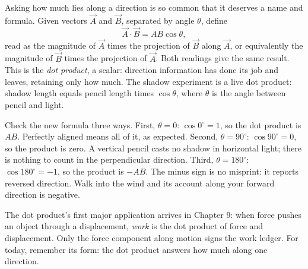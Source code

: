 \begin{mainline}
Asking how much lies along a direction is so common that it deserves a name and formula. Given vectors \(\vec{A}\) and \(\vec{B}\), separated by angle \(\theta\), define
\[
  \vec{A}\cdot\vec{B} = AB\cos\theta ,
\]
read as the magnitude of \(\vec{A}\) times the projection of \(\vec{B}\) along \(\vec{A}\), or equivalently the magnitude of \(\vec{B}\) times the projection of \(\vec{A}\). Both readings give the same result. This is the \emph{dot product}, a scalar: direction information has done its job and leaves, retaining only how much. The shadow experiment is a live dot product: shadow length equals pencil length times \(\cos\theta\), where \(\theta\) is the angle between pencil and light.

Check the new formula three ways. First, \(\theta=0\): \(\cos 0^{\circ}=1\), so the dot product is \(AB\). Perfectly aligned means all of it, as expected. Second, \(\theta=90^{\circ}\): \(\cos 90^{\circ}=0\), so the product is zero. A vertical pencil casts no shadow in horizontal light; there is nothing to count in the perpendicular direction. Third, \(\theta=180^{\circ}\): \(\cos 180^{\circ}=-1\), so the product is \(-AB\). The minus sign is no misprint: it reports reversed direction. Walk into the wind and its account along your forward direction is negative.

The dot product's first major application arrives in Chapter 9: when force pushes an object through a displacement, \emph{work} is the dot product of force and displacement. Only the force component along motion signs the work ledger. For today, remember its form: the dot product answers how much along one direction.
\end{mainline}

